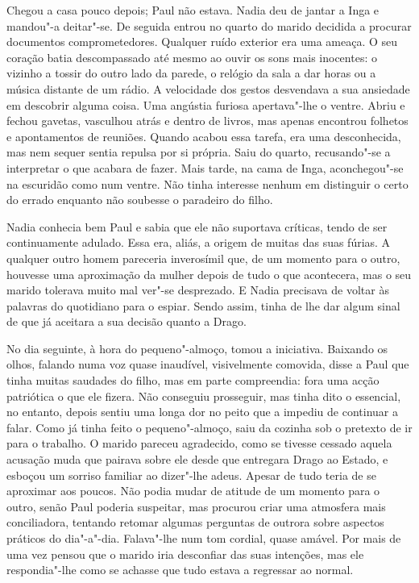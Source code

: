 Chegou a casa pouco depois; Paul não estava. Nadia deu de jantar a Inga
e mandou"-a deitar"-se. De seguida entrou no quarto do marido decidida a
procurar documentos comprometedores. Qualquer ruído exterior era uma
ameaça. O seu coração batia descompassado até mesmo ao ouvir os sons
mais inocentes: o vizinho a tossir do outro lado da parede, o relógio da
sala a dar horas ou a música distante de um rádio. A velocidade dos
gestos desvendava a sua ansiedade em descobrir alguma coisa. Uma
angústia furiosa apertava"-lhe o ventre. Abriu e fechou gavetas,
vasculhou atrás e dentro de livros, mas apenas encontrou folhetos e
apontamentos de reuniões. Quando acabou essa tarefa, era uma
desconhecida, mas nem sequer sentia repulsa por si própria. Saiu do
quarto, recusando"-se a interpretar o que acabara de fazer. Mais tarde,
na cama de Inga, aconchegou"-se na escuridão como num ventre. Não tinha
interesse nenhum em distinguir o certo do errado enquanto não soubesse o
paradeiro do filho.

Nadia conhecia bem Paul e sabia que ele não suportava críticas, tendo de
ser continuamente adulado. Essa era, aliás, a origem de muitas das suas
fúrias. A qualquer outro homem pareceria inverosímil que, de um momento
para o outro, houvesse uma aproximação da mulher depois de tudo o que
acontecera, mas o seu marido tolerava muito mal ver"-se desprezado. E
Nadia precisava de voltar às
palavras do quotidiano para o espiar. Sendo assim, tinha de lhe dar
algum sinal de que já aceitara a sua decisão quanto a Drago.

No dia seguinte, à hora do pequeno"-almoço, tomou a iniciativa. Baixando
os olhos, falando numa voz quase inaudível, visivelmente comovida, disse
a Paul que tinha muitas saudades do filho, mas em parte compreendia:
fora uma acção patriótica o que ele fizera. Não conseguiu prosseguir,
mas tinha dito o essencial, no entanto, depois sentiu uma longa dor no
peito que a impediu de continuar a falar. Como já tinha feito o
pequeno"-almoço, saiu da cozinha sob o pretexto de ir para o trabalho. O
marido pareceu agradecido, como se tivesse cessado aquela acusação muda
que pairava sobre ele desde que entregara Drago ao Estado, e esboçou um
sorriso familiar ao dizer"-lhe adeus. Apesar de tudo teria de se
aproximar aos poucos. Não podia mudar de atitude de um momento para o
outro, senão Paul poderia suspeitar, mas procurou criar uma atmosfera
mais conciliadora, tentando retomar algumas perguntas de outrora sobre
aspectos práticos do dia"-a"-dia. Falava"-lhe num tom cordial, quase
amável. Por mais de uma vez pensou que o marido iria desconfiar das suas
intenções, mas ele respondia"-lhe como se achasse que tudo
estava a regressar ao normal.

